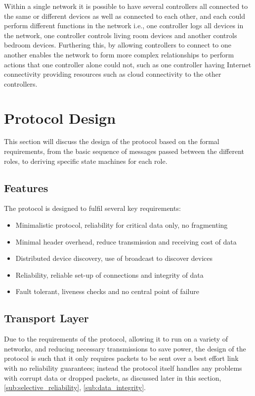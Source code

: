 Within a single network it is possible to have several controllers all connected to the same or different devices as well as connected to each other, and each could perform different functions in the network i.e., one controller logs all devices in the network, one controller controls living room devices and another controls bedroom devices. Furthering this, by allowing controllers to connect to one another enables the network to form more complex relationships to perform actions that one controller alone could not, such as one controller having Internet connectivity providing resources such as cloud connectivity to the other controllers.


\section{Protocol Design} %
\label{sec:protocol_design}
This section will discuss the design of the protocol based on the formal requirements, from the basic sequence of messages passed between the different roles, to deriving specific state machines for each role.

\subsection{Features} %
\label{sub:features}
The protocol is designed to fulfil several key requirements:
\begin{itemize}
	\item Minimalistic protocol, reliability for critical data only, no fragmenting
	\item Minimal header overhead, reduce transmission and receiving cost of data
	\item Distributed device discovery, use of broadcast to discover devices
	\item Reliability, reliable set-up of connections and integrity of data
	\item Fault tolerant, liveness checks and no central point of failure
\end{itemize}


\subsection{Transport Layer}
Due to the requirements of the protocol, allowing it to run on a variety of networks, and reducing necessary transmissions to save power, the design of the protocol is such that it only requires packets to be sent over a best effort link with no reliability guarantees; instead the protocol itself handles any problems with corrupt data or dropped packets, as discussed later in this section,\ref{sub:selective_reliability}, \ref{sub:data_integrity}. 

